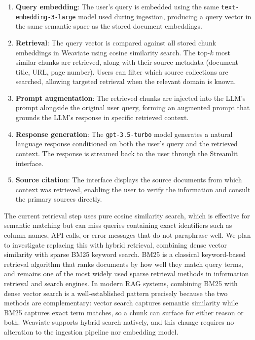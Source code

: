 \begin{enumerate}
  \item \textbf{Query embedding}: The user's query is embedded using the same \texttt{text-embedding-3-large} model used during ingestion, producing a query vector in the same semantic space as the stored document embeddings.
  \item \textbf{Retrieval}: The query vector is compared against all stored chunk embeddings in Weaviate using cosine similarity search. The top-$k$ most similar chunks are retrieved, along with their source metadata (document title, URL, page number). Users can filter which source collections are searched, allowing targeted retrieval when the relevant domain is known.
  \item \textbf{Prompt augmentation}: The retrieved chunks are injected into the LLM's prompt alongside the original user query, forming an augmented prompt that grounds the LLM's response in specific retrieved context.
  \item \textbf{Response generation}: The \texttt{gpt-3.5-turbo} model generates a natural language response conditioned on both the user's query and the retrieved context. The response is streamed back to the user through the Streamlit interface.
  \item \textbf{Source citation}: The interface displays the source documents from which context was retrieved, enabling the user to verify the information and consult the primary sources directly.
\end{enumerate}

The current retrieval step uses pure cosine similarity search, which is effective for semantic matching but can miss queries containing exact identifiers such as column names, API calls, or error messages that do not paraphrase well.
We plan to investigate replacing this with hybrid retrieval, combining dense vector similarity with sparse BM25 keyword search.
BM25 is a classical keyword-based retrieval algorithm that ranks documents by how well they match query terms, and remains one of the most widely used sparse retrieval methods in information retrieval and search engines\cite{Robertson2009}.
In modern RAG systems, combining BM25 with dense vector search is a well-established pattern precisely because the two methods are complementary: vector search captures semantic similarity while BM25 captures exact term matches, so a chunk can surface for either reason or both\cite{Luan2021}.
Weaviate supports hybrid search natively, and this change requires no alteration to the ingestion pipeline nor embedding model.

